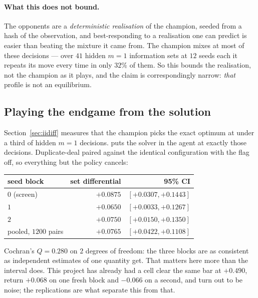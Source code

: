 \documentclass[11pt,letterpaper]{article}
\begin{document}
\paragraph{What this does not bound.} The opponents are a \emph{deterministic
realisation} of the champion, seeded from a hash of the observation, and
best-responding to a realisation one can predict is easier than beating the
mixture it came from. The champion mixes at most of these decisions --- over
$41$ hidden $m = 1$ information sets at $12$ seeds each it repeats its move
every time in only $32\%$ of them. So this bounds the realisation, not the
champion as it plays, and the claim is correspondingly narrow: \emph{that}
profile is not an equilibrium.

\subsection{Playing the endgame from the solution}
\label{sec:exactplay}

Section~\ref{sec:iidiff} measures that the champion picks the exact optimum at
under a third of hidden $m = 1$ decisions.  puts
the solver in the agent at exactly those decisions. Duplicate-deal paired
against the identical configuration with the flag off, so everything but the
policy cancels:

\begin{center}
\begin{tabular}{lrr}
\toprule
seed block & set differential & 95\% CI \\
\midrule
$0$ (screen) & $+0.0875$ & $[+0.0307, +0.1443]$ \\
$1$ & $+0.0650$ & $[+0.0033, +0.1267]$ \\
$2$ & $+0.0750$ & $[+0.0150, +0.1350]$ \\
\midrule
pooled, $1200$ pairs & $\mathbf{+0.0765}$ & $\mathbf{[+0.0422, +0.1108]}$ \\
\bottomrule
\end{tabular}
\end{center}

Cochran's $Q = 0.280$ on $2$ degrees of freedom: the three blocks are as
consistent as independent estimates of one quantity get. That matters here more
than the interval does. This project has already had a cell clear the same bar
at $+0.490$, return $+0.068$ on one fresh block and $-0.066$ on a second, and
turn out to be noise; the replications are what separate this from that.
\end{document}
